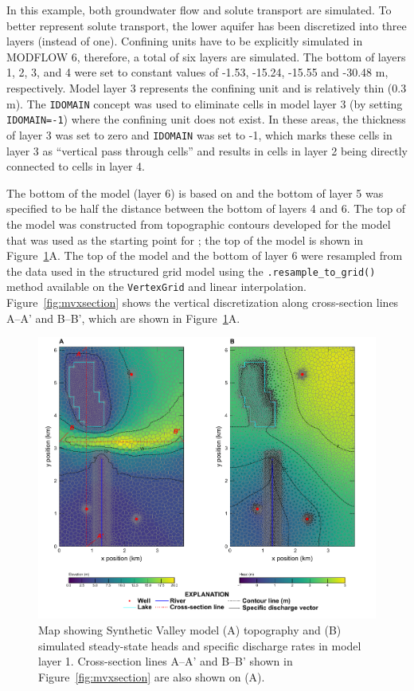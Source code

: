 \documentclass[12pt, oneside]{article}  	%
\begin{document}
In this example, both groundwater flow \citep{modflow6gwf} and solute transport \citep{modflow6gwt} are simulated. To better represent solute transport, the lower aquifer has been discretized into three layers (instead of one). Confining units have to be explicitly simulated in MODFLOW 6, therefore, a total of six layers are simulated. The bottom of layers 1, 2, 3, and 4 were set to constant values of -1.53, -15.24, -15.55 and -30.48 m, respectively. Model layer 3 represents the confining unit and is relatively thin (0.3 m). The \texttt{IDOMAIN} concept \citep{modflow6gwf} was used to eliminate cells in model layer 3 (by setting \texttt{IDOMAIN=-1}) where the confining unit does not exist. In these areas, the thickness of layer 3 was set to zero and \texttt{IDOMAIN} was set to -1, which marks these cells in layer 3 as ``vertical pass through cells'' and results in cells in layer 2 being directly connected to cells in layer 4. 

The bottom of the model (layer 6) is based on \cite{hill1998} and the bottom of layer 5 was specified to be half the distance between the bottom of layers 4 and 6. The top of the model was constructed from topographic contours developed for the model that was used as the starting point for \cite{hill1998} \citep{pollock2014percomm}; the top of the model is shown in Figure~\ref{fig:mvmap}A. The top of the model and the bottom of layer 6 were resampled from the data used in the structured grid model using the \texttt{.resample\_to\_grid()} method available on the \texttt{VertexGrid} and linear interpolation. Figure~\ref{fig:mvxsection} shows the vertical discretization along cross-section lines A--A' and B--B', which are shown in Figure~\ref{fig:mvmap}A.

\begin{figure}[ht!]
	\begin{center}
		\includegraphics{figures/mv_voronoi_map.pdf}
	\end{center}
	\caption{Map showing Synthetic Valley model (A) topography and (B) simulated steady-state heads and specific discharge rates in model layer 1. Cross-section lines A--A' and B--B' shown in Figure~\ref{fig:mvxsection} are also shown on (A).}
	\label{fig:mvmap}
\end{figure}
\end{document}
